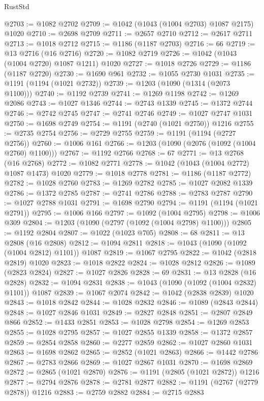 \begin{lexlean}{RustStd}
\begin{coremodule}
{\begin{coremodule}
{{{{{{{{{{{{{{{{{{{{{{{{{{@2703 := @1082 @2702
@2709 := @1042 (@1043 (@1004 @2703) @1087 @2175) @1020
@2710 := @2698 @2709
@2711 := @2657 @2710
@2712 := @2617 @2711
@2713 := @1018 @2712
@2715 := @1186 (@1187 @2703)
@2716 := 66
@2719 := @13 @2716 (@16 @2716)
@2720 := @1082 @2719
@2726 := @1042 (@1043 (@1004 @2720) @1087 @1211) @1020
@2727 := @1018 @2726
@2729 := @1186 (@1187 @2720)
@2730 := @1690 @961
@2732 := @1055 @2730 @1031
@2735 := @1191 (@1194 (@1021 @2732))
@2739 := @1203 (@1090 (@1314 (@2073 @1100)))
@2740 := @1192 @2739
@2741 := @1269 @1198
@2742 := @1269 @2086
@2743 := @1027 @1346
@2744 := @2743 @1339
@2745 := @1372 @2744
@2746 := @2742 @2745
@2747 := @2741 @2746
@2749 := @1027 @2747 @1031
@2750 := @1698 @2749
@2754 := @1191 (@2740 (@1021 @2750)) @1216
@2755 := @2735 @2754
@2756 := @2729 @2755
@2759 := @1191 (@1194 (@2727 @2756))
@2760 := @1006 @161
@2766 := @1203 (@1090 (@2076 (@1092 (@1004 @2760) @1100)))
@2767 := @1192 @2766
@2768 := 67
@2771 := @13 @2768 (@16 @2768)
@2772 := @1082 @2771
@2778 := @1042 (@1043 (@1004 @2772) @1087 @1473) @1020
@2779 := @1018 @2778
@2781 := @1186 (@1187 @2772)
@2782 := @1028 @2760
@2783 := @1269 @2782
@2785 := @1027 @2082 @1339
@2786 := @1372 @2785
@2787 := @2741 @2786
@2788 := @2783 @2787
@2790 := @1027 @2788 @1031
@2791 := @1698 @2790
@2794 := @1191 (@1194 (@1021 @2791))
@2795 := @1006 @166
@2797 := @1092 (@1004 @2795)
@2798 := @1006 @309
@2804 := @1203 (@1090 (@2797 (@1092 (@1004 @2798) @1100)))
@2805 := @1192 @2804
@2807 := @1022 (@1023 @705)
@2808 := 68
@2811 := @13 @2808 (@16 @2808)
@2812 := @1094 @2811
@2818 := @1043 (@1090 (@1092 (@1004 @2812) @1101)) @1087
@2819 := @1067 @2795
@2822 := @1042 (@2818 @2819) @1020
@2823 := @1018 @2822
@2824 := @1028 @2812
@2826 := @1089 (@2823 @2824)
@2827 := @1027 @2826
@2828 := 69
@2831 := @13 @2828 (@16 @2828)
@2832 := @1094 @2831
@2838 := @1043 (@1090 (@1092 (@1004 @2832) @1101)) @1087
@2839 := @1067 @2074
@2842 := @1042 (@2838 @2839) @1020
@2843 := @1018 @2842
@2844 := @1028 @2832
@2846 := @1089 (@2843 @2844)
@2848 := @1027 @2846 @1031
@2849 := @2827 @2848
@2851 := @2807 @2849 @866
@2852 := @1433 @2851
@2853 := @1028 @2798
@2854 := @1269 @2853
@2855 := @1028 @2795
@2857 := @1027 @2855 @1339
@2858 := @1372 @2857
@2859 := @2854 @2858
@2860 := @2277 @2859
@2862 := @1027 @2860 @1031
@2863 := @1698 @2862
@2865 := @2852 (@1021 @2863)
@2866 := @1442 @2786
@2867 := @2783 @2866
@2869 := @1027 @2867 @1031
@2870 := @1698 @2869
@2872 := @2865 (@1021 @2870)
@2876 := @1191 (@2805 (@1021 @2872)) @1216
@2877 := @2794 @2876
@2878 := @2781 @2877
@2882 := @1191 (@2767 (@2779 @2878)) @1216
@2883 := @2759 @2882
@2884 := @2715 @2883
}}}}}}}}}}}}}}}}}}}}}}}}}}
\end{coremodule}}
\end{coremodule}
\end{lexlean}
